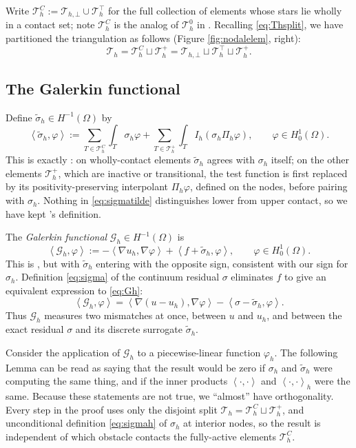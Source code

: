\documentclass[12pt]{amsart}
\numberwithin{equation}{section}
\theoremstyle{plain}
\theoremstyle{definition}
\theoremstyle{remark}
\newcommand{\Om}{\Omega}
\newcommand{\Th}{\mathcal{T}_h}
\newcommand{\Ih}{I_h}
\newcommand{\Pih}{\Pi_h}
\newcommand{\Thbot}{\mathcal{T}_{h,\bot}}
\newcommand{\Thtop}{\Th^\top}
\newcommand{\Thplus}{\Th^+}
\newcommand{\ThC}{\Th^C}
\newcommand{\Gh}{\mathcal{G}_h}
\begin{document}
Write $\ThC := \Thbot \cup \Thtop$ for the full collection of elements whose stars lie wholly in a contact set; note $\ThC$ is the analog of $\mathcal{T}_h^0$ in \cite{NSV03}.  Recalling \eqref{eq:Thsplit}, we have partitioned the triangulation as follows (Figure \ref{fig:nodalelem}, right):
\begin{equation}
\label{eq:elemdisjoint}
\Th = \ThC \sqcup \Thplus = \Thbot \sqcup \Thtop \sqcup \Thplus.
\end{equation}

\subsection{The Galerkin functional}  Define $\tilde\sigma_h \in H^{-1}(\Om)$ by
\begin{equation}
\label{eq:sigmatilde}
  \left<\tilde\sigma_h,\varphi\right> := \sum_{T\in\ThC}\int_T \sigma_h\varphi + \sum_{T\in\Thplus}\int_T \Ih(\sigma_h\Pih\varphi), \qquad \varphi \in H_0^1(\Om).
\end{equation}
This is exactly \cite[formula (3.1)]{NSV03}: on wholly-contact elements $\tilde\sigma_h$ agrees with $\sigma_h$ itself; on the other elements $\Thplus$, which are inactive or transitional, the test function is first replaced by its positivity-preserving interpolant $\Pih\varphi$, defined on the nodes, before pairing with $\sigma_h$.  Nothing in \eqref{eq:sigmatilde} distinguishes lower from upper contact, so we have kept \cite{NSV03}'s definition.

The \emph{Galerkin functional} $\Gh \in H^{-1}(\Om)$ is
\begin{equation}
\label{eq:Gh}
  \left<\Gh,\varphi\right> := -\left<\nabla u_h,\nabla\varphi\right> + \left< f + \tilde\sigma_h,\varphi\right>, \qquad \varphi \in H_0^1(\Om).
\end{equation}
This is \cite[formula (3.3)]{NSV03}, but with $\tilde\sigma_h$ entering with the opposite sign, consistent with our sign for $\sigma_h$.  Definition \eqref{eq:sigma} of the continuum residual $\sigma$ eliminates $f$ to give an equivalent expression to \eqref{eq:Gh}:
\begin{equation}
\label{eq:Ghagain}
\left<\Gh,\varphi\right> = \left<\nabla(u-u_h),\nabla\varphi\right> - \left<\sigma-\tilde\sigma_h,\varphi\right>.
\end{equation}
Thus $\Gh$ measures two mismatches at once, between $u$ and $u_h$, and between the exact residual $\sigma$ and its discrete surrogate $\tilde\sigma_h$.

Consider the application of $\Gh$ to a piecewise-linear function $\varphi_h$.  The following Lemma can be read as saying that the result would be zero if $\sigma_h$ and $\tilde \sigma_h$ were computing the same thing, and if the inner products $\left<\cdot,\cdot\right>$ and $\left<\cdot,\cdot\right>_h$ were the same.  Because these statements are not true, we ``almost'' have orthogonality.  Every step in the proof uses only the disjoint split $\Th = \ThC \sqcup \Thplus$, and unconditional definition \eqref{eq:sigmah} of $\sigma_h$ at interior nodes, so the result is independent of which obstacle contacts the fully-active elements $\ThC$.
\end{document}
